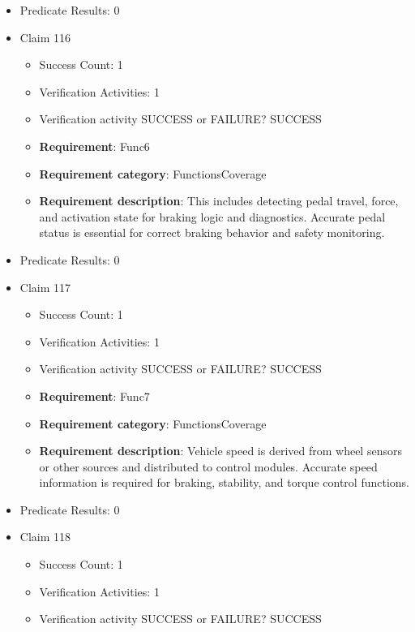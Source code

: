 \documentclass{article}
\begin{document}
\begin{itemize}
\begin{itemize}
				\end{itemize}
				
									    
				\item Predicate Results: 0

  				  \item Claim 116
				\begin{itemize}
			    	\item Success Count: 1 
			    	\item Verification Activities: 1
					\item Verification activity SUCCESS or FAILURE? SUCCESS
		
						\item \textbf{Requirement}: Func6 
						\item \textbf{Requirement category}: FunctionsCoverage 
						\item \textbf{Requirement description}: This includes detecting pedal travel, force, and activation state for braking logic and diagnostics. Accurate pedal status is essential for correct braking behavior and safety monitoring.
					
				\end{itemize}
				
									    
				\item Predicate Results: 0

  				  \item Claim 117
				\begin{itemize}
			    	\item Success Count: 1 
			    	\item Verification Activities: 1
					\item Verification activity SUCCESS or FAILURE? SUCCESS
		
						\item \textbf{Requirement}: Func7 
						\item \textbf{Requirement category}: FunctionsCoverage 
						\item \textbf{Requirement description}: Vehicle speed is derived from wheel sensors or other sources and distributed to control modules. Accurate speed information is required for braking, stability, and torque control functions.
					
				\end{itemize}
				
									    
				\item Predicate Results: 0

  				  \item Claim 118
				\begin{itemize}
			    	\item Success Count: 1 
			    	\item Verification Activities: 1
					\item Verification activity SUCCESS or FAILURE? SUCCESS
		

\end{itemize}
\end{itemize}
\end{document}
